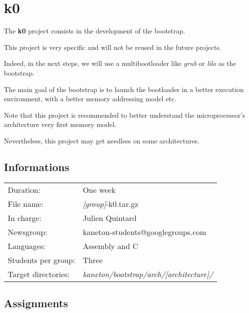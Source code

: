 
%
%

\chapter{k0}

The \textbf{k0} project consists in the development of the bootstrap.

This project is very specific and will not be reused in the future
projects.

Indeed, in the next steps, we will use a multibootloader like \textit{grub}
or \textit{lilo} as the bootstrap.

The main goal of the bootstrap is to launch the bootloader in a better
execution environment, with a better memory addressing model etc.

Note that this project is recommended to better understand the
microprocessor's architecture very first memory model.

Nevertheless, this project may get needless on some architectures.

\newpage

%
%

\section{Informations}

\begin{tabular}{p{7cm}l}
Duration: & One week \\
File name: & \textit{[group]}-k0.tar.gz \\
In charge: & Julien Quintard \\
Newsgroup: & kaneton-students@googlegroups.com \\
Languages: & Assembly and C \\
Students per group: & Three \\
Target directories: & \textit{kaneton/bootstrap/arch/[architecture]/} \\
\end{tabular}

%
%

\section{Assignments}

